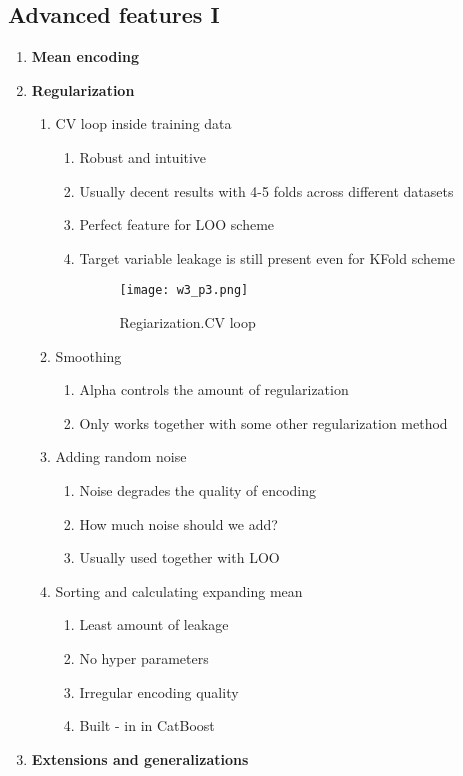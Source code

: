 \documentclass[11pt, twoside]{article}   	%
\begin{document}
 
\subsection{Advanced features I}
 \begin{enumerate}
\item \textbf{Mean encoding} 
\item \textbf{Regularization}
      \begin{enumerate}
      \item CV loop inside training data
       \begin{enumerate}
          \item Robust and intuitive
          \item Usually decent results with 4-5 folds across different datasets
          \item Perfect feature for LOO scheme
          \item Target variable leakage is still present even for KFold scheme
    \begin{figure}
    [!htb]\centering
    \texttt{[image: w3\_p3.png]}
    \caption{Regiarization.CV loop}
  \label{fig:phase}
  \end{figure}
          \end{enumerate}
      \item Smoothing
       \begin{enumerate}
          \item Alpha controls the amount of regularization
          \item Only works together with some other regularization method
        \end{enumerate}          
      \item Adding random noise
       \begin{enumerate}
          \item Noise degrades the quality of encoding
          \item How much noise should we add?
          \item  Usually used together with LOO
        \end{enumerate}          
      \item Sorting and calculating expanding mean        
       \begin{enumerate}
          \item Least amount of leakage
          \item No hyper parameters
          \item Irregular encoding quality
          \item Built - in in CatBoost 
        \end{enumerate}   
     \end{enumerate}
\item \textbf{Extensions and generalizations}

 \end{enumerate}
   
\end{document}
